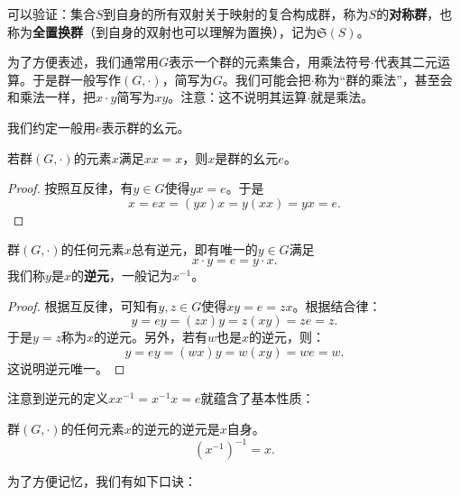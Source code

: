\documentclass[12pt,UTF8,fontset=none]{ctexbook}
\begin{document}
\begin{ex}
    可以验证：集合$S$到自身的所有双射关于映射的复合构成群，称为$S$的\textbf{对称群}，也称为\textbf{全置换群}（到自身的双射也可以理解为置换），记为$\mathfrak{S}(S)$。
\end{ex}

为了方便表述，我们通常用$G$表示一个群的元素集合，用乘法符号$\cdot$代表其二元运算。于是群一般写作$(G,\cdot)$，简写为$G$。我们可能会把$\cdot$称为“群的乘法”，甚至会和乘法一样，把$x\cdot y$简写为$xy$。注意：这不说明其运算$\cdot$就是乘法。

我们约定一般用$e$表示群的幺元。

\begin{tm}\label{tm:g-40}
    若群$(G,\cdot)$的元素$x$满足$xx = x$，则$x$是群的幺元$e$。
\end{tm}
\begin{proof}
    按照互反律，有$y\in G$使得$yx = e$。于是
    $$ x = ex = (yx)x = y(xx) = yx = e. $$
\end{proof}

\begin{tm}\label{tm:g-50}
    群$(G,\cdot)$的任何元素$x$总有逆元，即有唯一的$y\in G$满足
    $$x\cdot y = e = y\cdot x.$$
    我们称$y$是$x$的\textbf{逆元}，一般记为$x^{-1}$。
\end{tm}
\begin{proof}
    根据互反律，可知有$y, z\in G$使得$xy = e = zx$。根据结合律：
    $$ y = ey = (zx)y = z(xy) = ze = z.$$
    于是$y = z$称为$x$的逆元。另外，若有$w$也是$x$的逆元，则：
    $$ y = ey = (wx)y = w(xy) = we = w.$$
    这说明逆元唯一。
\end{proof}

注意到逆元的定义$xx^{-1} = x^{-1}x = e$就蕴含了基本性质：
\begin{tm}
    群$(G,\cdot)$的任何元素$x$的逆元的逆元是$x$自身。
    $$
    \left(x^{-1}\right)^{-1} = x. 
    $$
\end{tm}

为了方便记忆，我们有如下口诀：

\vspace{16pt}

\end{document}
